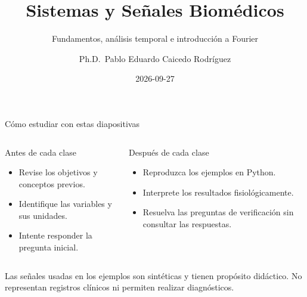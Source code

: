 \documentclass[
  ignorenonframetext,
  aspectratio=169,
  spanish,
  professionalfonts]{beamer}
\title{\texorpdfstring{Sistemas y Señales
Biomédicos}{Sistemas y Señales Biomédicos}}
\subtitle{\texorpdfstring{Fundamentos, análisis temporal e introducción
a Fourier}{Fundamentos, análisis temporal e introducción a Fourier}}
\author{Ph.D.~Pablo Eduardo Caicedo Rodríguez}
\date{2026-09-27}
\providecommand{\tightlist}{%
  \setlength{\itemsep}{0pt}\setlength{\parskip}{0pt}}
\begin{document}
\frame{\titlepage}


\begin{frame}
\end{frame}

\begin{frame}{Cómo estudiar con estas diapositivas}
\protect{}\label{cuxf3mo-estudiar-con-estas-diapositivas}
\begin{columns}[T]
\begin{column}{0.48\linewidth}
\begin{block}{Antes de cada clase}
\protect{}\label{antes-de-cada-clase}
\begin{itemize}
\tightlist
\item
  Revise los objetivos y conceptos previos.
\item
  Identifique las variables y sus unidades.
\item
  Intente responder la pregunta inicial.
\end{itemize}
\end{block}
\end{column}

\begin{column}{0.48\linewidth}
\begin{block}{Después de cada clase}
\protect{}\label{despuuxe9s-de-cada-clase}
\begin{itemize}
\tightlist
\item
  Reproduzca los ejemplos en Python.
\item
  Interprete los resultados fisiológicamente.
\item
  Resuelva las preguntas de verificación sin consultar las respuestas.
\end{itemize}
\end{block}
\end{column}
\end{columns}

\begin{tcolorbox}[enhanced jigsaw, arc=.35mm, bottomrule=.15mm, bottomtitle=1mm, breakable, colback=white, colbacktitle=quarto-callout-warning-color!10!white, colframe=quarto-callout-warning-color-frame, coltitle=black, left=2mm, leftrule=.75mm, opacityback=0, opacitybacktitle=0.6, rightrule=.15mm, title={Alcance}, titlerule=0mm, toprule=.15mm, toptitle=1mm]

Las señales usadas en los ejemplos son sintéticas y tienen propósito
didáctico. No representan registros clínicos ni permiten realizar
diagnósticos.

\end{tcolorbox}
\end{frame}
\end{document}
